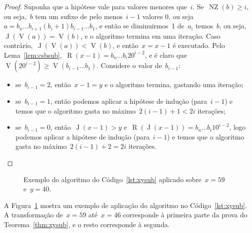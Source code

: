 \documentclass[main.tex]{subfiles}
\newcommand{\NZ}{\operatorname{NZ}}
\renewcommand{\V}{\operatorname{V}}
\newcommand{\R}{\operatorname{R}}
\newcommand{\J}{\operatorname{J}}
\begin{document}
\begin{proof}
	Suponha que a hipótese vale para valores menores que~$i$. Se~${\NZ(b) \geq i}$, ou seja,~$b$ tem um sufixo de pelo menos~$i - 1$ valores 0, ou seja~${a = b_n \ldots b_{i + 1} (b_{i} + 1) b_{i - 1} \ldots b_1}$, e então se diminuirmos~1 de~$a_{i}$ temos~$b$, ou seja,~${\J(\V(a)) = \V(b)}$, e o algoritmo termina em uma iteração.
	Caso contrário,~$\J(\V(a)) < \V(b)$, e então~$x = x - 1$ é executado. Pelo Lema~\ref{lem:csbsub},~${\R(x - 1) = b_n \ldots b_i 2 0^{i-2}}$, e é claro que~${\V(20^{i-2}) \geq \V(b_{i-1} \ldots b_1)}$. Considere o valor de~$b_{i-1}$:
	\begin{itemize}
		\item se~$b_{i-1} = 2$, então~$x - 1 = y$ e o algoritmo termina, gastando uma iteração;
		\item se~$b_{i-1} = 1$, então podemos aplicar a hipótese de indução (para~$i-1$) e temos que o algoritmo gasta no máximo~$2(i - 1) + 1 < 2i$ iterações;
		\item se~$b_{i-1} = 0$, então~$\J(x - 1) > y$ e~$\R(\J(x - 1)) = b_n \ldots b_i 1 0^{i-2}$, logo podemos aplicar a hipótese de indução (para~$i-1$) e temos que o algoritmo gasta no máximo~$2(i-1) + 2 = 2i$ iterações.
	\end{itemize}
\end{proof}

\begin{figure}
\caption{Exemplo do algoritmo do Código~\ref{lst:xysub} aplicado sobre~$x = 59$ e~$y = 40$.} \label{fig:exxysub}
\end{figure}

A Figura~\ref{fig:exxysub} mostra um exemplo de aplicação do algoritmo no Código~\ref{lst:xysub}. A transformação de~$x = 59$ até~$x = 46$ corresponde à primeira parte da prova do Teorema~\ref{thm:xysub}, e o resto corresponde à segunda.
\end{document}

